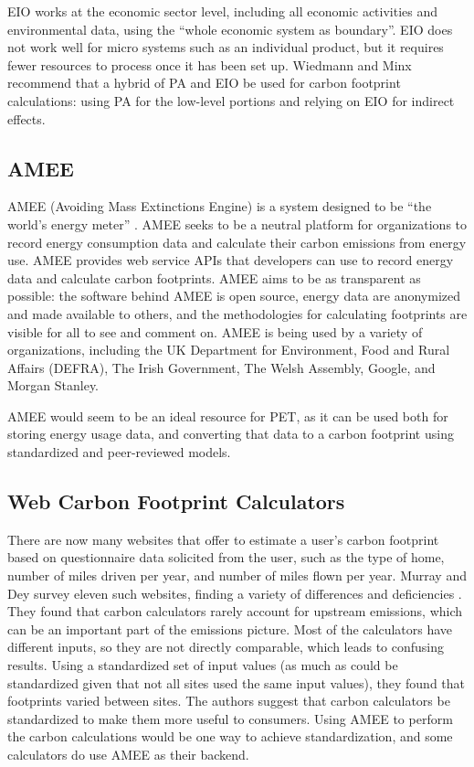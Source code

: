 EIO works at the economic sector level, including all economic activities and environmental data, using the ``whole economic system as boundary''. EIO does not work well for micro systems such as an individual product, but it requires fewer resources to process once it has been set up. Wiedmann and Minx recommend that a hybrid of PA and EIO be used for carbon footprint calculations: using PA for the low-level portions and relying on EIO for indirect effects.

\subsection{AMEE}
\label{sec:amee}

AMEE (Avoiding Mass Extinctions Engine) is a system designed to be ``the world's energy meter'' \cite{AMEE-website}. AMEE seeks to be a neutral platform for organizations to record energy consumption data and calculate their carbon emissions from energy use. AMEE provides web service APIs that developers can use to record energy data and calculate carbon footprints. AMEE aims to be as transparent as possible: the software behind AMEE is open source, energy data are anonymized and made available to others, and the methodologies for calculating footprints are visible for all to see and comment on. AMEE is being used by a variety of organizations, including the UK Department for Environment, Food and Rural Affairs (DEFRA), The Irish Government, The Welsh Assembly, Google, and Morgan Stanley.

AMEE would seem to be an ideal resource for PET, as it can be used both for storing energy usage data, and converting that data to a carbon footprint using standardized and peer-reviewed models.

\subsection{Web Carbon Footprint Calculators}
\label{sec:carbon-calculators}

There are now many websites that offer to estimate a user's carbon footprint based on questionnaire data solicited from the user, such as the type of home, number of miles driven per year, and number of miles flown per year. Murray and Dey survey eleven such websites, finding a variety of differences and deficiencies \cite{Murray2007Carbon-neutral}. They found that carbon calculators rarely account for upstream emissions, which can be an important part of the emissions picture. Most of the calculators have different inputs, so they are not directly comparable, which leads to confusing results. Using a standardized set of input values (as much as could be standardized given that not all sites used the same input values), they found that footprints varied between sites. The authors suggest that carbon calculators be standardized to make them more useful to consumers. Using AMEE to perform the carbon calculations would be one way to achieve standardization, and some calculators do use AMEE as their backend.

